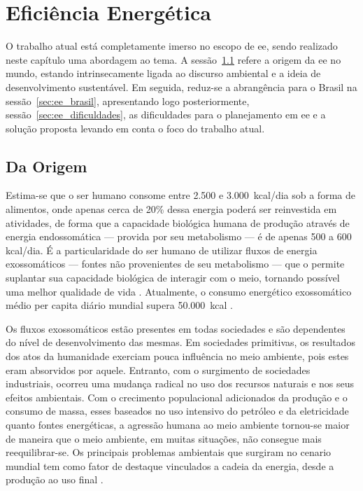 \chapter{Eficiência Energética}
\label{chap:ee}
\glsresetall

O trabalho atual está completamente imerso no escopo de \gls{ee},
sendo realizado neste capítulo uma abordagem ao tema. 
A sessão~\ref{sec:ee_origem} refere a origem da \gls{ee} no mundo, estando
intrinsecamente ligada ao discurso ambiental e a ideia de desenvolvimento
sustentável. Em seguida, reduz-se a abrangência para o Brasil na
sessão~\ref{sec:ee_brasil}, apresentando logo posteriormente, 
sessão~\ref{sec:ee_dificuldades}, as dificuldades para o planejamento em \gls{ee} 
e a solução proposta levando em conta o foco do trabalho atual.

\section{Da Origem}
\label{sec:ee_origem}

Estima-se que o ser humano consome entre 2.500 e 3.000~\acrshort{kcal}/dia sob a 
forma de alimentos, onde apenas cerca de 20\% dessa energia poderá ser 
reinvestida em atividades, de forma que a capacidade biológica humana de produção
através de energia endossomática --- provida por seu metabolismo --- é de 
apenas 500 a 600 \acrshort{kcal}/dia. É a particularidade do ser humano de
utilizar fluxos de energia exossomáticos --- fontes não provenientes de seu metabolismo 
--- que o permite suplantar sua capacidade biológica de interagir com o meio,
tornando possível uma melhor qualidade de vida \cite{rippel}. 
Atualmente, o consumo energético exossomático médio per capita diário 
mundial supera 50.000~\acrshort{kcal} \cite{world_statics_2012}.

Os fluxos exossomáticos estão presentes em todas sociedades e são dependentes do
nível de desenvolvimento das mesmas. Em sociedades primitivas, os resultados dos
atos da humanidade exerciam pouca influência no meio ambiente, pois estes eram
absorvidos por aquele. Entranto, com o surgimento de sociedades industriais,
ocorreu uma mudança radical no uso dos recursos naturais e nos seus efeitos
ambientais. Com o crecimento populacional adicionados da produção e o consumo 
de massa, esses baseados no uso intensivo do petróleo e da eletricidade quanto 
fontes energéticas, a agressão humana ao meio ambiente tornou-se maior de maneira 
que o meio ambiente, em muitas situações, não consegue mais reequilibrar-se. 
Os principais problemas ambientais que surgiram no cenario mundial tem 
como fator de destaque vinculados a cadeia da energia, 
desde a produção ao uso final \cite{rippel,jatoba}.

